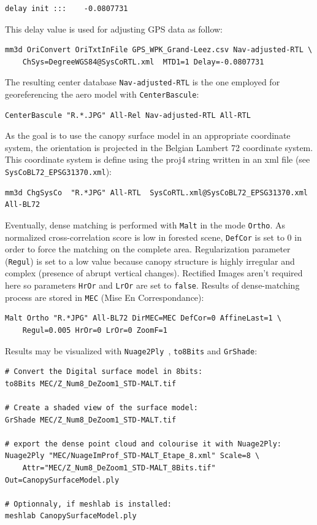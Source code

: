 \begin{verbatim}
delay init :::    -0.0807731
\end{verbatim}

This delay value is used for adjusting GPS data as follow:

\begin{verbatim}
mm3d OriConvert OriTxtInFile GPS_WPK_Grand-Leez.csv Nav-adjusted-RTL \
	ChSys=DegreeWGS84@SysCoRTL.xml 	MTD1=1 Delay=-0.0807731
\end{verbatim}

The resulting center database {\tt Nav-adjusted-RTL} is the one employed for georeferencing the aero model with { \tt CenterBascule}:

\begin{verbatim}
CenterBascule "R.*.JPG" All-Rel Nav-adjusted-RTL All-RTL
\end{verbatim}

As the goal is to use the canopy surface model in an appropriate coordinate system, the orientation is projected in the Belgian Lambert 72 coordinate system. This coordinate system is define using the proj4 string written in an xml file (see {\tt SysCoBL72\_EPSG31370.xml}):

\begin{verbatim}
mm3d ChgSysCo  "R.*JPG" All-RTL  SysCoRTL.xml@SysCoBL72_EPSG31370.xml   All-BL72
\end{verbatim}

Eventually, dense matching is performed with {\tt Malt} in the mode {\tt Ortho}. As normalized cross-correlation score is low in forested scene, {\tt DefCor} is set to $0$ in order to force the matching on the complete area. Regularization parameter ({\tt Regul}) is set to a low value because canopy structure is highly irregular and complex (presence of abrupt vertical changes). Rectified Images aren't required here so parameters {\tt HrOr} and {\tt LrOr} are set to {\tt false}. Results of dense-matching process are stored in {\tt MEC} (Mise En Correspondance):
\begin{verbatim}
Malt Ortho "R.*JPG" All-BL72 DirMEC=MEC DefCor=0 AffineLast=1 \
	Regul=0.005 HrOr=0 LrOr=0 ZoomF=1
\end{verbatim}

Results may be visualized with {\tt Nuage2Ply },  {\tt to8Bits} and {\tt GrShade}:

\begin{verbatim}
# Convert the Digital surface model in 8bits:
to8Bits MEC/Z_Num8_DeZoom1_STD-MALT.tif

# Create a shaded view of the surface model:
GrShade MEC/Z_Num8_DeZoom1_STD-MALT.tif

# export the dense point cloud and colourise it with Nuage2Ply:
Nuage2Ply "MEC/NuageImProf_STD-MALT_Etape_8.xml" Scale=8 \
	Attr="MEC/Z_Num8_DeZoom1_STD-MALT_8Bits.tif" Out=CanopySurfaceModel.ply

# Optionnaly, if meshlab is installed:
meshlab CanopySurfaceModel.ply
\end{verbatim}

